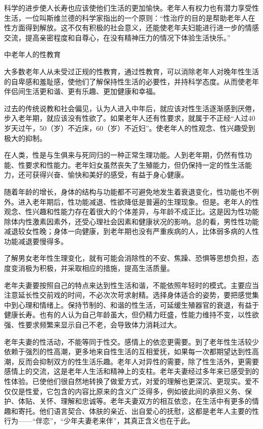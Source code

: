 \documentclass[12pt,UTF8]{ctexbook}
\begin{document}
科学的进步使人长寿也应该使他们生活的更加愉快。老年人有权力也有潜力享受性生活，一位叫斯维兰德的科学家指出的一个原则：“性治疗的目的是帮助老年人在性方面得到解放。这不仅有积极的社会意义，还能使老年夫妇能进行进一步的情感交流，提高亲密程度和自尊心，在没有精神压力的情况下体验生活快乐。”





中老年人的性教育


大多数老年人从未受过正规的性教育，通过性教育，可以消除老年人对晚年性生活的自卑感和羞耻感，使他们了解保持性生活的必要性，并持科学态度。从而使老年伴侣间生活更和谐、更有乐趣、更加健康和幸福。

过去的传统说教和社会偏见，认为人进入中年后，就应该对性生活逐渐感到厌倦，步入老年期，就应该没有性欲了。如果老年人还有性要求，就属于不正经“人过40岁天过午，50（岁）不近床，60（岁）不近妇”。使老年人的性观念、性兴趣受到极大的抑制。

在人类，性是与生俱来与死同归的一种正常生理功能。人到老年期，仍然有性功能、性要求和性能力。老年妇女虽然丧失了生殖能力，但仍保持一定的性生活能力，还可获得兴奋、愉快和美好的感受，有益于身心健康。

随着年龄的增长，身体的结构与功能都不可避免地发生着衰退变化，性功能也不例外。进入老年期后，性功能减退、性欲降低是普遍的生理现象。但是。老年人的性观念、性兴趣和性能力存在着很大的个体差异，与年龄不成正比。这是因为性功能除体内性激素因素外，还受心理社会因素和健康状况的影响。总的看，男性性功能减退较女性晚；身体一向健康，到老年期也没有严重疾病的人，比体弱多病的人性功能减退要慢得多。

了解男女老年性生理变化，就有可能会消除性的不安、焦躁、恐惧等思想负担，态度变消极为积极，并采取相应的措施，提高生活质量。

老年夫妻要按照自己的特点来达到性生活和谐，不能依照年轻时的模式。主要应当注意延长性交前戏的时间，不必次次苛求射精。选择身体适合的姿势，要把感觉集中到心理和情绪上。保持节制的、和谐的性生活，可延缓生殖器官的衰退，有益于健康长寿。也有的人认为自己年龄虽大，但仍精力旺盛，性能力维持不变，以性欲强、性要求频繁来显示自己不老，会导致体力消耗过大。

老年夫妻的性活动，不能等同于性交。感情上的依恋更需要。到了老年性生活较少依赖于强烈的性高潮，更多地来自性生活的互相爱抚，如果每一次都期望达到性高潮，反而会抑制双方的性生活乐趣。老年人对异性的需要，除了性生活外，更需要感情上的交流，这是老年人生活和精神上的支柱。老年夫妻经过多年来已感受到的性体验。已使他们很自然地转换了做爱方式，对爱的理解也更深沉、更现实。爱不仅仅是性爱，它包含的内容比原来的含义广泛得多，例如彼此间的承担义务、保护、体贴、关怀、理解和忠诚等。老年夫妻双方的相互依恋，在生活中有更多的情趣和寄托。他们语言契合、体肤的亲近、出自爱心的抚慰，这都是老年人主要的性行为——“伴恋”，“少年夫妻老来伴”，其真正含义也在于此。
\end{document}
